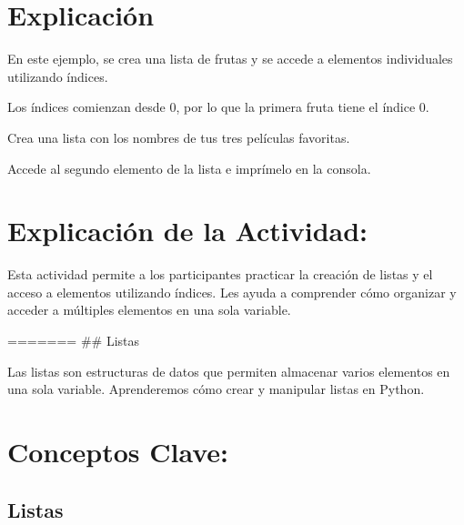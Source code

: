 \documentclass[
  a4paper,
  onepage,
  openany]{scrreprt}
\begin{document}
\hypertarget{explicaciuxf3n-18}{%
\section{Explicación}\label{explicaciuxf3n-18}}

En este ejemplo, se crea una lista de frutas y se accede a elementos
individuales utilizando índices.

Los índices comienzan desde 0, por lo que la primera fruta tiene el
índice 0.

\begin{tcolorbox}[enhanced jigsaw, breakable, opacityback=0, toptitle=1mm, coltitle=black, toprule=.15mm, rightrule=.15mm, colframe=quarto-callout-important-color-frame, opacitybacktitle=0.6, arc=.35mm, title=\textcolor{quarto-callout-important-color}{\faExclamation}\hspace{0.5em}{Actividad Práctica:}, titlerule=0mm, colbacktitle=quarto-callout-important-color!10!white, bottomtitle=1mm, bottomrule=.15mm, colback=white, left=2mm, leftrule=.75mm]

Crea una lista con los nombres de tus tres películas favoritas.

Accede al segundo elemento de la lista e imprímelo en la consola.

\end{tcolorbox}

\hypertarget{explicaciuxf3n-de-la-actividad-16}{%
\section{Explicación de la
Actividad:}\label{explicaciuxf3n-de-la-actividad-16}}

Esta actividad permite a los participantes practicar la creación de
listas y el acceso a elementos utilizando índices. Les ayuda a
comprender cómo organizar y acceder a múltiples elementos en una sola
variable.

======= \#\# Listas

Las listas son estructuras de datos que permiten almacenar varios
elementos en una sola variable. Aprenderemos cómo crear y manipular
listas en Python.

\hypertarget{conceptos-clave-19}{%
\section{Conceptos Clave:}\label{conceptos-clave-19}}

\hypertarget{listas-2}{%
\subsection{Listas}\label{listas-2}}
\end{document}
